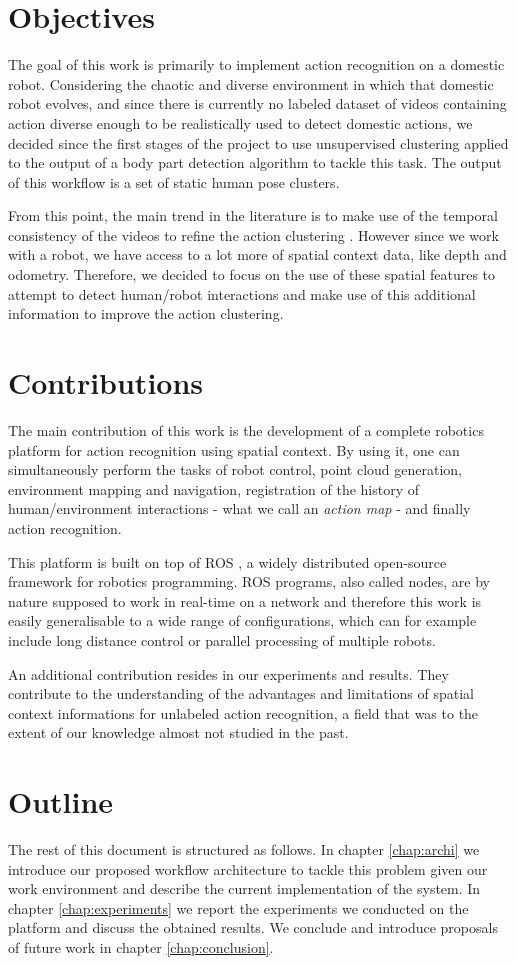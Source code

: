 \section{Objectives}
The goal of this work is primarily to implement action recognition on a domestic robot. Considering the chaotic and diverse environment in which that domestic robot evolves, and since there is currently no labeled dataset of videos containing action diverse enough to be realistically used to detect domestic actions, we decided since the first stages of the project to use unsupervised clustering applied to the output of a body part detection algorithm to tackle this task. The output of this workflow is a set of static human pose clusters. 

From this point, the main trend in the literature is to make use of the temporal consistency of the videos to refine the action clustering \cite{unsup_time_seq_action_recognition, action_matching}. However since we work with a robot, we have access to a lot more of spatial context data, like depth and odometry. Therefore, we decided to focus on the use of these spatial features to attempt to detect human/robot interactions and make use of this additional information to improve the action clustering.

\section{Contributions}
The main contribution of this work is the development of a complete robotics platform for action recognition using spatial context. By using it, one can simultaneously perform the tasks of robot control, point cloud generation, environment mapping and navigation, registration of the history of human/environment interactions - what we call an \emph{action map} - and finally action recognition.

This platform is built on top of ROS \cite{ROS}, a widely distributed open-source framework for robotics programming. ROS programs, also called nodes, are by nature supposed to work in real-time on a network and therefore this work is easily generalisable to a wide range of configurations, which can for example include long distance control or parallel processing of multiple robots.

An additional contribution resides in our experiments and results. They contribute to the understanding of the advantages and limitations of spatial context informations for unlabeled action recognition, a field that was to the extent of our knowledge almost not studied in the past. 

\section{Outline}
The rest of this document is structured as follows. In chapter \ref{chap:archi} we introduce our proposed workflow architecture to tackle this problem given our work environment and describe the current implementation of the system. In chapter \ref{chap:experiments} we report the experiments we conducted on the platform and discuss the obtained results. We conclude and introduce proposals of future work in chapter \ref{chap:conclusion}. 